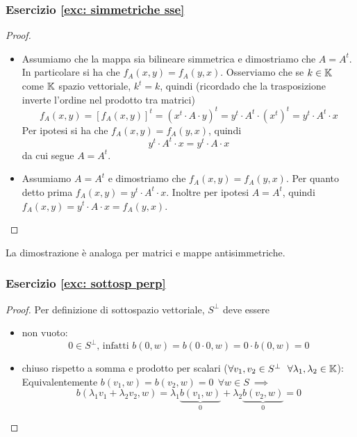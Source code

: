 \documentclass{article}     %
\begin{document}
\subsubsection*{Esercizio \ref{exc: simmetriche sse}}\label{sol: simmetriche sse}
\begin{proof}~
    \begin{itemize}
        \item [\say{$\Rarr$}] Assumiamo che la mappa sia bilineare simmetrica e dimostriamo che $A=A^t$. In particolare si ha che $f_A(x,y)=f_A(y,x)$. Osserviamo che se $k \in \mathbb{K}$ come $\mathbb{K}$ spazio vettoriale, $k^t=k$, quindi (ricordado che la trasposizione inverte l'ordine nel prodotto tra matrici)
        \[f_A(x,y)=[f_A(x,y)]^t=\left( x^t\cdot A \cdot y \right)^t= y^t\cdot  A^t \cdot \left( x^t \right)^t= y^t\cdot A^t \cdot x \] 
        Per ipotesi si ha che $f_A(x,y)=f_A(y,x)$, quindi 
        \[y^t\cdot A^t \cdot x= y^t\cdot A \cdot x\]
        da cui segue $A=A^t$.
        \item [\say{$\Larr$}] Assumiamo $A=A^t$ e dimostriamo che $f_A(x,y)=f_A(y,x)$. Per quanto detto prima $f_A(x,y)=y^t\cdot A^t\cdot x$. Inoltre per ipotesi $A=A^t$, quindi $f_A(x,y)=y^t\cdot A\cdot x=f_A(y,x)$.
    \end{itemize}
\end{proof}
La dimostrazione è analoga per matrici e mappe antisimmetriche.

\subsubsection*{Esercizio \ref{exc: sottosp perp}}\label{sol: sottosp perp}
\begin{proof}Per definizione di sottospazio vettoriale, $S^\perp$ deve essere
    \begin{itemize}
        \item non vuoto:
        \[0\in S^\perp\text{, infatti }b(0,w)=b(0\cdot 0,w)=0\cdot b(0,w)=0\]
        \item chiuso rispetto a somma e prodotto per scalari ($\forall v_1,v_2\in S^\perp\ \ \forall \lambda_1, \lambda_2\in \mathbb{K}$):\\
        Equivalentemente $b(v_1,w)=b(v_2,w)=0\ \ \forall w\in S\ \implies$
        \[b(\lambda_1v_1+\lambda_2v_2,w)= \lambda_1\underbrace{b(v_1,w)}_0+\lambda_2\underbrace{b(v_2,w)}_0= 0\]
    \end{itemize}
\end{proof}
\end{document}
